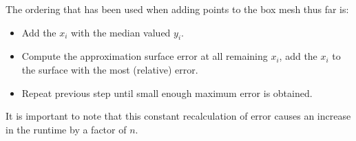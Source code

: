 \documentclass[11pt,margin=1in]{article}
\begin{document}
The ordering that has been used when adding points to the box mesh thus far is:

\begin{itemize}
\item Add the $x_i$ with the median valued $y_i$.
\item Compute the approximation surface error at all remaining $x_i$,
  add the $x_i$ to the surface with the most (relative) error.
\item Repeat previous step until small enough maximum error is obtained.
\end{itemize}

It is important to note that this constant recalculation of error
causes an increase in the runtime by a factor of $n$.
\end{document}
